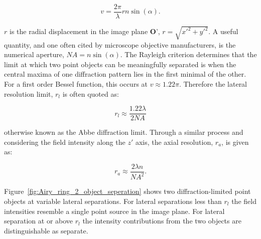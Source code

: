 \begin{equation}\label{eq:normalised_lateral}
v = \frac{2\pi}{\lambda}rn\sin(\alpha).
\end{equation}

$r$ is the radial displacement in the image plane $\textbf{O'}$, $r = \sqrt{x'^{2} + y'^{2}}$. 
A useful quantity, and one often cited by microscope objective manufacturers, 
is the numerical aperture, $NA = n\sin(\alpha)$. The Rayleigh criterion 
determines that the limit at which two point objects can be meaningfully 
separated is when the central maxima of one diffraction pattern lies in the
first minimal of the other\cite{rayleigh1874xii,rayleigh1880investigations}. For a first order Bessel 
function, this occurs at $v \approx 1.22\pi$. Therefore the lateral resolution 
limit, $r_l$ is often quoted as:

\begin{equation}\label{eq:lateral_res}
r_l \approx \frac{1.22\lambda}{2NA}
\end{equation}

otherwise known as the Abbe diffraction limit\cite{abbe1873beitrage}. Through
a similar process and considering the field intensity along the $z'$ axis, the
axial resolution, $r_a$, is given as\cite{pawley2006handbook}:

\begin{equation}\label{eq:axial_res}
r_a \approx \frac{2\lambda n}{NA^{2}}.
\end{equation}

Figure~\ref{fig:Airy_ring_2_object_seperation} shows two 
diffraction-limited point objects at variable lateral separations. For 
lateral separations less than $r_{l}$ the field intensities resemble a single 
point source in the image plane. For lateral separation at or above $r_{l}$ 
the intensity contributions from the two objects are distinguishable as 
separate.

